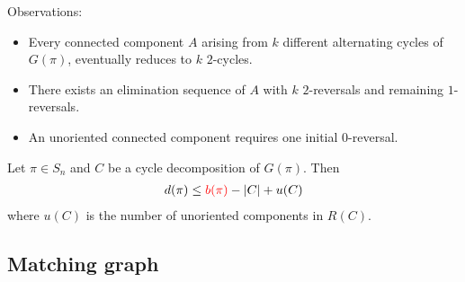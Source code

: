 \documentclass{beamer}
\theoremstyle{definition}
\def\spadding{\vspace{0.25cm}}
\def\r{\textcolor{red}}
\begin{document}
\begin{frame}



Observations:
\begin{itemize}
    \item Every connected component $A$ arising from $k$ different alternating cycles of $G(\pi)$, eventually reduces to $k$ $2$-cycles.\pause
    \item There exists an elimination sequence of $A$ with $k$ $2$-reversals and remaining $1$-reversals.\pause
    \item An unoriented connected component requires one initial $0$-reversal.
\end{itemize}\spadding\pause

\begin{theorem}
\label{thm:4}
Let $\pi \in S_n$ and $C$ be a cycle decomposition of $G(\pi)$. Then
\begin{align*}
    d(\pi) \leq \r{b(\pi)} - |C| + u(C)
\end{align*}
where $u(C)$ is the number of unoriented components in $R(C)$.
\end{theorem}

\end{frame}

\subsection{Matching graph}
\end{document}
